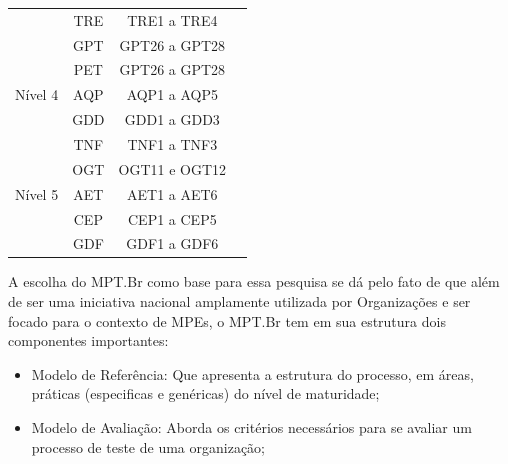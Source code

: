 \begin{table}[H]
{\begin{tabular}{|l|l|l|l|}
    \cline{2-3}
    \multicolumn{1}{|c|}{} & \multicolumn{1}{c|}{TRE} & \multicolumn{1}{c|}{TRE1 a TRE4} & \multicolumn{1}{c|}{} \\ 
    \cline{2-3}
    \multicolumn{1}{|c|}{} & \multicolumn{1}{c|}{GPT} & \multicolumn{1}{c|}{GPT26 a GPT28} & \multicolumn{1}{c|}{} \\ 
    \cline{2-3}
    \multicolumn{1}{|c|}{} & \multicolumn{1}{c|}{PET} & \multicolumn{1}{c|}{GPT26 a GPT28} & \multicolumn{1}{c|}{} \\ 
    \hline
    \multicolumn{1}{|c|}{Nível 4} & \multicolumn{1}{c|}{AQP} & \multicolumn{1}{c|}{AQP1 a AQP5} & \multicolumn{1}{c|}{} \\ 
    \cline{2-3}
    \multicolumn{1}{|c|}{} & \multicolumn{1}{c|}{GDD} & \multicolumn{1}{c|}{GDD1 a GDD3} & \multicolumn{1}{c|}{} \\ 
    \cline{2-3}
    \multicolumn{1}{|c|}{} & \multicolumn{1}{c|}{TNF} & \multicolumn{1}{c|}{TNF1 a TNF3} & \multicolumn{1}{c|}{} \\ 
    \cline{2-3}
    \multicolumn{1}{|c|}{} & \multicolumn{1}{c|}{OGT} & \multicolumn{1}{c|}{OGT11 e OGT12} & \multicolumn{1}{c|}{} \\ 
    \hline
    \multicolumn{1}{|c|}{Nível 5} & \multicolumn{1}{c|}{AET} & \multicolumn{1}{c|}{AET1 a AET6} & \multicolumn{1}{c|}{} \\ 
    \cline{2-3}
    \multicolumn{1}{|c|}{} & \multicolumn{1}{c|}{CEP} & \multicolumn{1}{c|}{CEP1 a CEP5} & \multicolumn{1}{c|}{} \\ 
    \cline{2-3}
    \multicolumn{1}{|c|}{} & \multicolumn{1}{c|}{GDF} & \multicolumn{1}{c|}{GDF1 a GDF6} & \multicolumn{1}{c|}{} \\ 
    \hline
    \end{tabular}
}
\end{table}

A escolha do MPT.Br como base para essa pesquisa se dá pelo fato de que além de ser uma iniciativa nacional amplamente utilizada por Organizações e ser focado para o contexto de MPEs, o MPT.Br tem em sua estrutura dois componentes importantes: 

\begin{itemize}
    \item Modelo de Referência: Que apresenta a estrutura do processo, em áreas, práticas (especificas e genéricas) do nível de maturidade;
    \item Modelo de Avaliação: Aborda os critérios necessários para se avaliar um processo de teste de uma organização;
\end{itemize}

